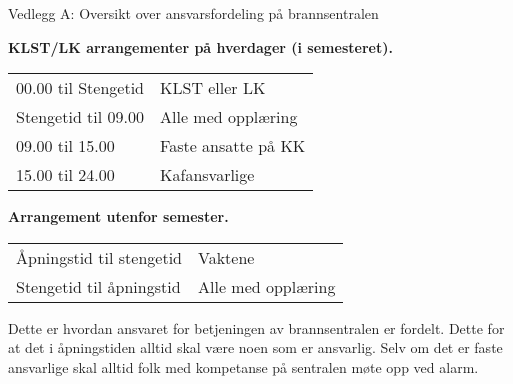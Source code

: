\begin{instruks}{Vedlegg A: Oversikt over ansvarsfordeling på brannsentralen}{}{}
    
    \textbf{KLST/LK arrangementer på hverdager (i semesteret).}
    
    
    \begin{tabular}{ll}
        00.00 til Stengetid &   KLST eller LK \\
        Stengetid til 09.00 &   Alle med opplæring \\
        09.00 til 15.00 &     Faste ansatte på KK \\
        15.00 til 24.00 &      Kafansvarlige 
    \end{tabular}

    
    \textbf{Arrangement utenfor semester.}
    
    
    \begin{tabular}{ll}
        Åpningstid til stengetid &     Vaktene \\
        Stengetid til åpningstid &     Alle med opplæring
    \end{tabular}

    
    Dette er hvordan ansvaret for betjeningen av brannsentralen er fordelt. Dette for at det i
    åpningstiden alltid skal være
    noen som er ansvarlig. Selv om det er faste ansvarlige skal alltid folk med kompetanse på
    sentralen møte opp ved
    alarm.


\end{instruks}



